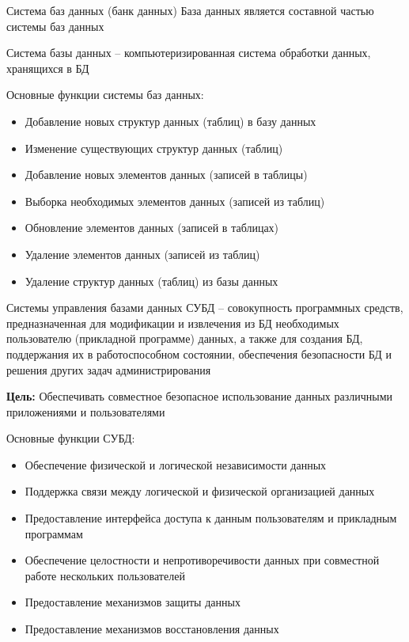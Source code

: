 \documentclass[12pt]{article}
\begin{document}
\begin{defin}{Система баз данных (банк данных)}
    База данных является составной частью системы баз данных 

    Система базы данных -- компьютеризированная система обработки данных, хранящихся в БД

    Основные функции системы баз данных:

    \begin{itemize}
        \item Добавление новых структур данных (таблиц) в базу данных
        \item Изменение существующих структур данных (таблиц)
        \item Добавление новых элементов данных (записей в таблицы)
        \item Выборка необходимых элементов данных (записей из таблиц)
        \item Обновление элементов данных (записей в таблицах)
        \item Удаление элементов данных (записей из таблиц)
        \item Удаление структур данных (таблиц) из базы данных 
    \end{itemize}
\end{defin}

\begin{defin}{Системы управления базами данных}
    СУБД -- совокупность программных средств, предназначенная для модификации и извлечения из БД необходимых пользователю (прикладной программе) данных, а также для создания БД, поддержания их в работоспособном состоянии, обеспечения безопасности БД и решения других задач администрирования

    \textbf{Цель:} Обеспечивать совместное безопасное использование данных различными приложениями и пользователями

    Основные функции СУБД:

    \begin{itemize}
        \item Обеспечение физической и логической независимости данных
        \item Поддержка связи между логической и физической организацией данных
        \item Предоставление интерфейса доступа к данным пользователям и прикладным программам
        \item Обеспечение целостности и непротиворечивости данных при совместной работе нескольких пользователей
        \item Предоставление механизмов защиты данных
        \item Предоставление механизмов восстановления данных
    \end{itemize}
\end{defin}
\end{document}
